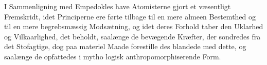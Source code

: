 \documentclass[12pt,a4paper]{book}
\begin{document}
I Sammenligning med Empedokles have Atomisterne gjort
et væsentligt Fremskridt, idet Principerne ere førte tilbage til
en mere almeen Bestemthed og til en mere begrebsmæssig
Modsætning, og idet deres Forhold taber den Uklarhed og
Vilkaarlighed, det beholdt, saalænge de bevægende Kræfter, der
sondredes fra det Stofagtige, dog paa materiel Maade forestille\-%
des blandede med dette, og saalænge de opfattedes i mytho\-%
logisk anthropomorphiserende Form.
%
%
%
%
\end{document}

